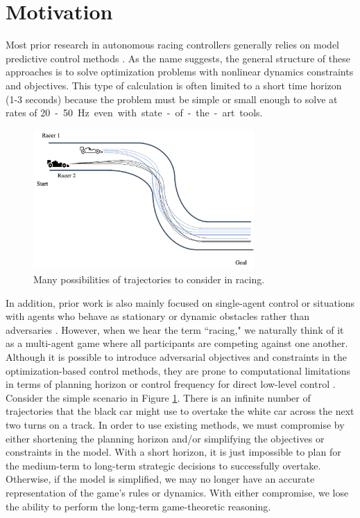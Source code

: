 \section{Motivation} %
Most prior research in autonomous racing controllers generally relies on model predictive control methods \cite{Liniger2014, Anderson2016, Kalaria2021, Kloeser2020, OKelly2020, Vazquez2020}. As the name suggests, the general structure of these approaches is to solve optimization problems with nonlinear dynamics constraints and objectives. This type of calculation is often limited to a short time horizon (1-3 seconds) because the problem must be simple or small enough to solve at rates of \SI{20}-\SI{50}{\hertz} even with state-of-the-art tools. 

\begin{figure}
\begin{center}
   \includegraphics[width=0.75\textwidth]{Figures/MotivatingExampleInfTraj.png}
\caption{Many possibilities of trajectories to consider in racing.}
\label{fig:motivating_example:inf}
\end{center}
\end{figure}

In addition, prior work is also mainly focused on single-agent control or situations with agents who behave as stationary or dynamic obstacles rather than adversaries \cite{Liniger2014, Anderson2016, Kalaria2021, Kloeser2020, OKelly2020, Vazquez2020, He2021, Hou2016, Stahl2019_2}. However, when we hear the term ``racing," we naturally think of it as a multi-agent game where all participants are competing against one another. Although it is possible to introduce adversarial objectives and constraints in the optimization-based control methods, they are prone to computational limitations in terms of planning horizon or control frequency for direct low-level control \cite{Liniger2020, Li2021}. Consider the simple scenario in Figure \ref{fig:motivating_example:inf}. There is an infinite number of trajectories that the black car might use to overtake the white car across the next two turns on a track. In order to use existing methods, we must compromise by either shortening the planning horizon and/or simplifying the objectives or constraints in the model. With a short horizon, it is just impossible to plan for the medium-term to long-term strategic decisions to successfully overtake. Otherwise, if the model is simplified, we may no longer have an accurate representation of the game's rules or dynamics. With either compromise, we lose the ability to perform the long-term game-theoretic reasoning.


